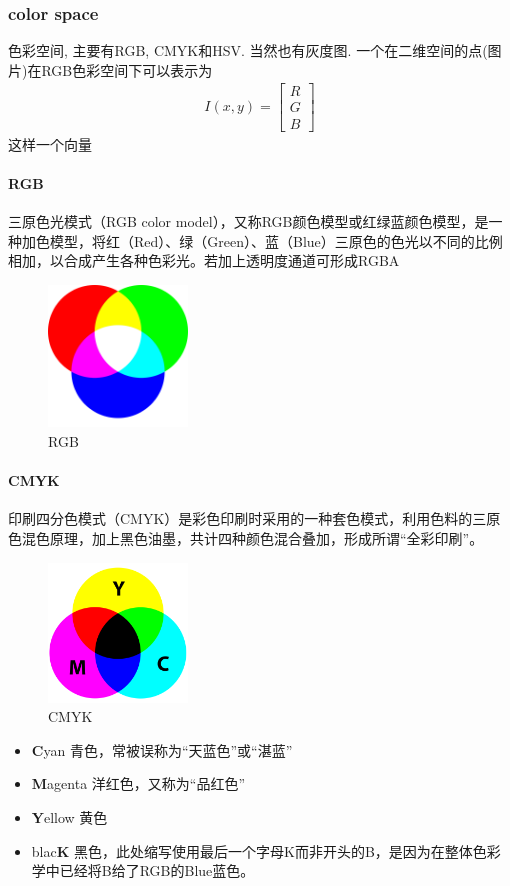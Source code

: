\documentclass[scheme=chinese,a4paper]{article}
\begin{document}
\subsubsection{color space} 色彩空间, 主要有RGB, CMYK和HSV. 当然也有灰度图. 一个在二维空间的点(图片)在RGB色彩空间下可以表示为
\begin{align*}
  I(x,y)=\begin{bmatrix}
    R\\
    G\\
    B
  \end{bmatrix}
\end{align*}这样一个向量
\paragraph{RGB} 
三原色光模式（RGB color model），又称RGB颜色模型或红绿蓝颜色模型，是一种加色模型，将红（Red）、绿（Green）、蓝（Blue）三原色的色光以不同的比例相加，以合成产生各种色彩光。若加上透明度通道可形成RGBA
\begin{figure}[H]
\centering
\includegraphics[width=0.33\textwidth]{rgb.png}
\caption{RGB}
\end{figure}
\paragraph{CMYK}
印刷四分色模式（CMYK）是彩色印刷时采用的一种套色模式，利用色料的三原色混色原理，加上黑色油墨，共计四种颜色混合叠加，形成所谓“全彩印刷”。
\begin{figure}[H]
\centering
\includegraphics[width=0.33\textwidth]{cmyk.png}
\caption{CMYK}
\end{figure}
\begin{itemize}
  \item \textbf{C}yan 青色，常被误称为“天蓝色”或“湛蓝”
  \item \textbf{M}agenta 洋红色，又称为“品红色”
  \item \textbf{Y}ellow 黄色
  \item blac\textbf{K} 黑色，此处缩写使用最后一个字母K而非开头的B，是因为在整体色彩学中已经将B给了RGB的Blue蓝色。
\end{itemize}
\end{document}
